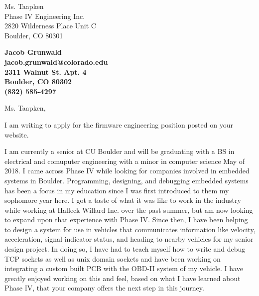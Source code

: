 \documentclass[11pt]{letter} %
\begin{document}

\begin{letter}{Ms. Taapken \\
Phase IV Engineering Inc. \\
2820 Wilderness Place Unit C \\
Boulder, CO 80301}


\begin{center}
\large\bf Jacob Grunwald \\ jacob.grunwald@colorado.edu \\
2311 Walnut St. Apt. 4 \\ Boulder, CO 80302 \\ (832) 585-4297 %
\end{center}
\vfill



\opening{Ms. Taapken,}

I am writing to apply for the firmware engineering position posted on your website.

I am currently a senior at CU Boulder and will be graduating with a BS in electrical and comuputer engineering with a minor in computer science May of 2018. I came across Phase IV while looking for companies involved in embedded systems in Boulder. Programming, designing, and debugging embedded systems has been a focus in my education since I was first introduced to them my sophomore year here. I got a taste of what it was like to work in the industry while working at Halleck Willard Inc. over the past summer, but am now looking to expand upon that experience with Phase IV. Since then, I have been helping to design a system for use in vehicles that communicates information like velocity, acceleration, signal indicator status, and heading to nearby vehicles for my senior design project. In doing so, I have had to teach myself how to write and debug TCP sockets as well as unix domain sockets and have been working on integrating a custom built PCB with the OBD-II system of my vehicle. I have greatly enjoyed working on this and feel, based on what I have learned about Phase IV, that your company offers the next step in this journey.


\end{letter}
\end{document}
